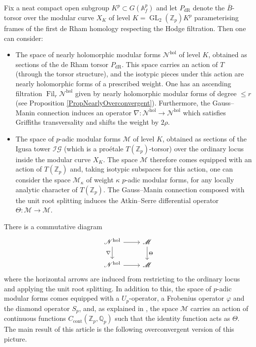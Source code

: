 \documentclass[10pt, oneside]{amsart}
\numberwithin{equation}{subsection}
\theoremstyle{definition}
\theoremstyle{remark}
\newcommand{\mbb}[1]{\mathbb{#1}}
\newcommand{\opn}[1]{\operatorname{#1}}
\begin{document}
Fix a neat compact open subgroup $K^p \subset G(\mbb{A}_f^p)$ and let $P_{\opn{dR}}$ denote the $\overline{B}$-torsor over the modular curve $X_K$ of level $K=\opn{GL}_2(\mbb{Z}_p) K^p$ parameterising frames of the first de Rham homology respecting the Hodge filtration. Then one can consider:
\begin{itemize}
    \item The space of nearly holomorphic modular forms $\mathscr{N}^{\opn{hol}}$ of level $K$, obtained as sections of the de Rham torsor $P_{\opn{dR}}$. This space carries an action of $T$ (through the torsor structure), and the isotypic pieces under this action are nearly holomorphic forms of a prescribed weight. One has an ascending filtration $\opn{Fil}_r\mathscr{N}^{\opn{hol}}$ given by nearly holomorphic modular forms of degree $\leq r$ (see Proposition \ref{PropNearlyOverconvergent}). Furthermore, the Gauss--Manin connection induces an operator $\nabla \colon \mathscr{N}^{\opn{hol}} \to \mathscr{N}^{\opn{hol}}$ which satisfies Griffiths transversality and shifts the weight by $2\rho$.
    \item The space of $p$-adic modular forms $\mathscr{M}$ of level $K$, obtained as sections of the Igusa tower $\mathcal{IG}$ (which is a pro\'{e}tale $T(\mbb{Z}_p)$-torsor) over the ordinary locus inside the modular curve $X_K$. The space $\mathscr{M}$ therefore comes equipped with an action of $T(\mbb{Z}_p)$ and, taking isotypic subspaces for this action, one can consider the space $\mathscr{M}_{\kappa}$ of weight $\kappa$ $p$-adic modular forms, for any locally analytic character of $T(\mbb{Z}_p)$. The Gauss--Manin connection composed with the unit root splitting induces the Atkin--Serre differential operator $\Theta \colon \mathscr{M} \to \mathscr{M}$.
\end{itemize}

There is a commutative diagram
\begin{equation} \label{NholToMpadicDiagram}
\begin{tikzcd}
\mathscr{N}^{\opn{hol}} \arrow[r] \arrow[d, "\nabla"'] & \mathscr{M} \arrow[d, "\Theta"] \\
\mathscr{N}^{\opn{hol}} \arrow[r]                      & \mathscr{M}                    
\end{tikzcd}
\end{equation}
where the horizontal arrows are induced from restricting to the ordinary locus and applying the unit root splitting. In addition to this, the space of $p$-adic modular forms comes equipped with a $U_p$-operator, a Frobenius operator $\varphi$ and the diamond operator $S_p$, and, as explained in \cite{howe2020unipotent}, the space $\mathscr{M}$ carries an action of continuous functions $C_{\opn{cont}}(\mbb{Z}_p, \mbb{Q}_p)$ such that the identity function acts as $\Theta$. The main result of this article is the following overconvergent version of this picture.
\end{document}
